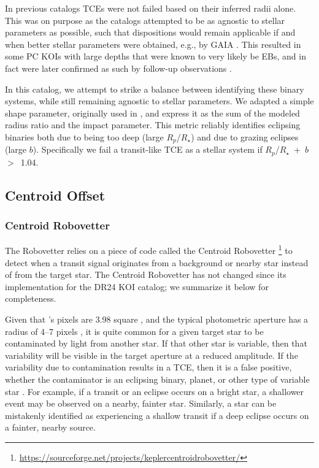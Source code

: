 In previous catalogs \citep{Rowe2015cat,Mullally2015cat,Coughlin2016} TCEs were not failed based on their inferred radii alone. This was on purpose as the catalogs attempted to be as agnostic to stellar parameters as possible, such that dispositions would remain applicable if and when better stellar parameters were obtained, e.g., by GAIA \citep{Cacciari2009,Mignard2005}. This resulted in some PC KOIs with large depths that were known to very likely be EBs, and in fact were later confirmed as such by follow-up observations \citep{Santerne2016}.

In this catalog, we attempt to strike a balance between identifying these binary systems, while still remaining agnostic to stellar parameters. We adapted a simple shape parameter, originally used in \citet{Batalha2013}, and express it as the sum of the modeled radius ratio and the impact parameter. This metric reliably identifies eclipsing binaries both due to being too deep (large $R_{p}$/$R_{\star}$) and due to grazing eclipses (large $b$). Specifically we fail a transit-like TCE as a stellar system if $R_{p}$/$R_{\star}$~+~$b$~$>$~1.04.



\subsection{Centroid Offset}
\subsubsection{Centroid Robovetter}
\label{s:centroidrv}
The Robovetter relies on a piece of code called the Centroid Robovetter \footnote{\url{https://sourceforge.net/projects/keplercentroidrobovetter/}}\citep{Mullally2017} to detect when a transit signal originates from a background or nearby star instead of from the target star. The Centroid Robovetter has not changed since its implementation for the DR24 KOI catalog; we summarize it below for completeness. 

Given that \kepler 's pixels are 3.98\arcsec{} square \citep{Koch2010}, and the typical photometric aperture has a radius of 4--7 pixels \citep{Bryson2010b}, it is quite common for a given target star to be contaminated by light from another star. If that other star is variable, then that variability will be visible in the target aperture at a reduced amplitude. If the variability due to contamination results in a TCE, then it is a false positive, whether the contaminator is an eclipsing binary, planet, or other type of variable star \citep{Bryson2013}. For example, if a transit or an eclipse occurs on a bright star, a shallower event may be observed on a nearby, fainter star. Similarly, a star can be mistakenly identified as experiencing a shallow transit if a deep eclipse occurs on a fainter, nearby source.

